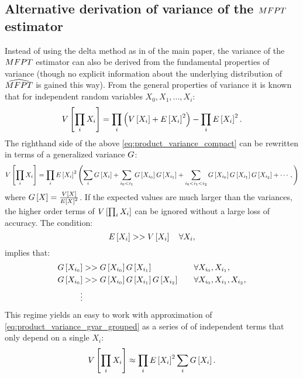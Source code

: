 %
%
%
%

\beginsupplemental

\subsection{Alternative derivation of variance of the $MFPT$ estimator}
\label{sec:sup_alt_var}
Instead of using the delta method as in  of the main paper, the variance of the  $MFPT$ estimator can also be derived from the fundamental properties of variance (though no explicit information about the underlying distribution of $\widehat{MFPT}$ is gained this way). From the general properties of variance it is known that for independent random variables $X_0, X_1, ..., X_i$:
        \begin{equation}
        \label{eq:product_variance_compact}
            V \left[ \prod_i X_i \right] = \prod_i \left(V \left[ X_i \right] + E \left[ X_i \right]^2\right) - \prod_i E \left[ X_i \right]^2.
        \end{equation}
The righthand side of the above \eqref{eq:product_variance_compact} can be rewritten in terms of a generalized variance $G$\supercite{Goodman:1962uc}:
        \begin{equation}
        \label{eq:product_variance_gvar_grouped}
            V \left[ \prod_i X_i \right] = \prod_i E \left[ X_i \right]^2 \left( \sum_i G \left[ X_i \right] + \sum_{i_0 < i_1} G \left[ X_{i_0} \right] G \left[ X_{i_1} \right] + \sum_{i_0 < i_1 < i_2} G \left[ X_{i_0} \right] G \left[ X_{i_1} \right] G \left[ X_{i_2} \right] + \cdots, \right)
        \end{equation}
where $G \left[ X \right] = \frac{V \left[ X \right]}{E \left[ X \right]^2}$. If the expected values are much larger than the variances, the higher order terms of $V \left[ \prod_i X_i \right]$ can be ignored without a large loss of accuracy. The condition:
    \begin{equation}
    \label{eq:product_variance_approx_condition}
        E \left[ X_i \right] >> V \left[ X_i \right] \quad \forall X_i,
    \end{equation}
implies that:
    \begin{align*}
        G \left[ X_{i_0} \right] &>> G \left[ X_{i_0} \right]G \left[ X_{i_1} \right] &\quad &\forall X_{i_0}, X_{i_1}, \\
        G \left[ X_{i_0} \right] &>> G \left[ X_{i_0} \right]G \left[ X_{i_1} \right]G \left[ X_{i_2} \right] &\quad &\forall X_{i_0}, X_{i_1}, X_{i_2},\\
        \vdots
    \end{align*}
This regime yields an easy to work with approximation of \eqref{eq:product_variance_gvar_grouped} as a series of of independent terms that only depend on a single $X_i$:
    \begin{equation}
    \label{eq:product_variance_approx}
        V \left[ \prod_i X_i \right] \approx \prod_i E \left[ X_i \right]^2 \sum_i G \left[ X_i \right].
    \end{equation}


